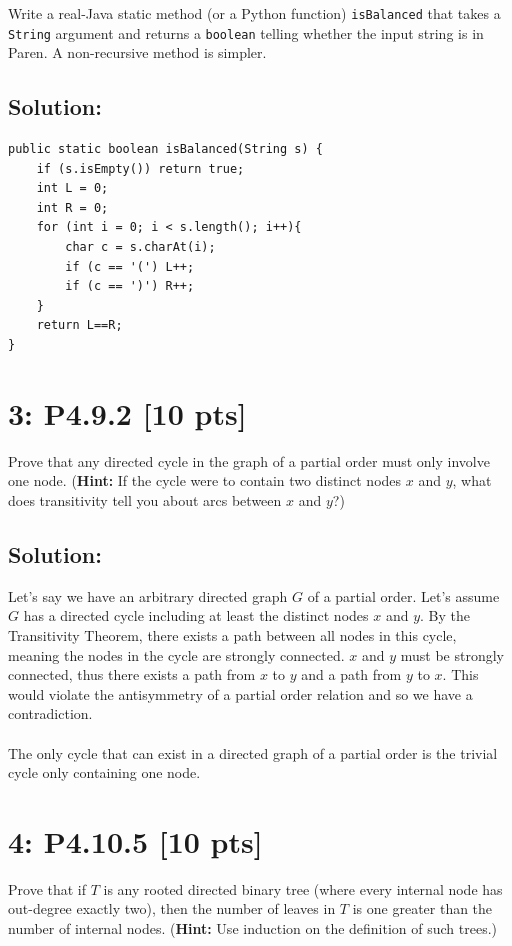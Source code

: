 \documentclass[12pt]{article}
\begin{document}
\noindent
Write a real-Java static method (or a Python function) \texttt{isBalanced} that takes a \texttt{String} argument and returns a \texttt{boolean} telling whether the input string is in Paren. A non-recursive method is simpler.

\subsection*{\textbf{Solution:}}
\begin{lstlisting}
public static boolean isBalanced(String s) {
	if (s.isEmpty()) return true;
	int L = 0;
	int R = 0;
	for (int i = 0; i < s.length(); i++){
		char c = s.charAt(i);
		if (c == '(') L++;
		if (c == ')') R++;
	}
	return L==R;
}
\end{lstlisting}


\newpage
\section*{\textbf{3: P4.9.2} [10 pts]}
Prove that any directed cycle in the graph of a partial order must only involve one node. (\textbf{Hint:} If the cycle were to contain two distinct nodes $x$ and $y$, what does transitivity tell you about arcs between $x$ and $y$?)


\subsection*{\textbf{Solution:}}
Let's say we have an arbitrary directed graph $G$ of a partial order. Let's assume $G$ has a directed cycle including at least the distinct nodes $x$ and $y$. By the Transitivity Theorem, there exists a path between all nodes in this cycle, meaning the nodes in the cycle are strongly connected. $x$ and $y$ must be strongly connected, thus there exists a path from $x$ to $y$ and a path from $y$ to $x$. This would violate the antisymmetry of a partial order relation and so we have a contradiction.\\\\
\noindent
The only cycle that can exist in a directed graph of a partial order is the trivial cycle only containing one node. 


\newpage
\section*{\textbf{4: P4.10.5} [10 pts]}
Prove that if $T$ is any rooted directed binary tree (where every internal node has out-degree exactly two), then the number of leaves in $T$ is one greater than the number of internal nodes. (\textbf{Hint:} Use induction on the definition of such trees.)
\end{document}
